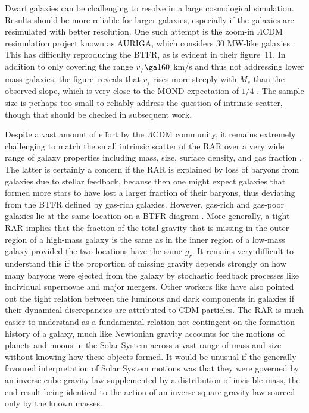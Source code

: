 \documentclass[fleqn,usenatbib,useAMS,onecolumn]{mnras} %
\begin{document}
Dwarf galaxies can be challenging to resolve in a large cosmological simulation. Results should be more reliable for larger galaxies, especially if the galaxies are resimulated with better resolution. One such attempt is the zoom-in $\Lambda$CDM resimulation project known as AURIGA, which considers 30 MW-like galaxies \citep{Grand_2017}. This has difficulty reproducing the BTFR, as is evident in their figure~11. In addition to only covering the range $v_{_f} \ga 160$ km/s and thus not addressing lower mass galaxies, the figure~reveals that $v_{_f}$ rises more steeply with $M_s$ than the observed slope, which is very close to the MOND expectation of $1/4$ \citep{McGaugh_2015}. The sample size is perhaps too small to reliably address the question of intrinsic scatter, though that should be checked in subsequent work.

Despite a vast amount of effort by the $\Lambda$CDM community, it remains extremely challenging to match the small intrinsic scatter of the RAR over a very wide range of galaxy properties including mass, size, surface density, and gas fraction \citep[figure~4 of][]{Lelli_2017}. The latter is certainly a concern if the RAR is explained by loss of baryons from galaxies due to stellar feedback, because then one might expect galaxies that formed more stars to have lost a larger fraction of their baryons, thus deviating from the BTFR defined by gas-rich galaxies. However, gas-rich and gas-poor galaxies lie at the same location on a BTFR diagram \citep[see e.g. figure~3 of][]{Famaey_McGaugh_2012}. More generally, a tight RAR implies that the fraction of the total gravity that is missing in the outer region of a high-mass galaxy is the same as in the inner region of a low-mass galaxy provided the two locations have the same $g_r$. It remains very difficult to understand this if the proportion of missing gravity depends strongly on how many baryons were ejected from the galaxy by stochastic feedback processes like individual supernovae and major mergers. Other workers like \citet{Salucci_2019} have also pointed out the tight relation between the luminous and dark components in galaxies if their dynamical discrepancies are attributed to CDM particles. The RAR is much easier to understand as a fundamental relation not contingent on the formation history of a galaxy, much like Newtonian gravity accounts for the motions of planets and moons in the Solar System across a vast range of mass and size without knowing how these objects formed. It would be unusual if the generally favoured interpretation of Solar System motions was that they were governed by an inverse cube gravity law supplemented by a distribution of invisible mass, the end result being identical to the action of an inverse square gravity law sourced only by the known masses.
\end{document}

